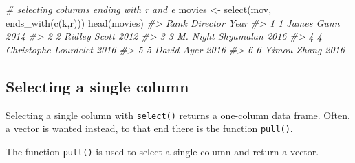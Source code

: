 \documentclass[
]{book}
\newenvironment{Shaded}{\begin{snugshade}}{\end{snugshade}}
\newcommand{\CommentTok}[1]{\textcolor[rgb]{0.56,0.35,0.01}{\textit{#1}}}
\newcommand{\FunctionTok}[1]{\textcolor[rgb]{0.00,0.00,0.00}{#1}}
\newcommand{\NormalTok}[1]{#1}
\newcommand{\OtherTok}[1]{\textcolor[rgb]{0.56,0.35,0.01}{#1}}
\newcommand{\StringTok}[1]{\textcolor[rgb]{0.31,0.60,0.02}{#1}}
\begin{document}
\begin{Shaded}
\begin{Highlighting}[]
\CommentTok{\# selecting columns ending with r and e}
\NormalTok{movies }\OtherTok{\textless{}{-}} \FunctionTok{select}\NormalTok{(mov, }\FunctionTok{ends\_with}\NormalTok{(}\FunctionTok{c}\NormalTok{(}\StringTok{\textquotesingle{}k\textquotesingle{}}\NormalTok{,}\StringTok{\textquotesingle{}r\textquotesingle{}}\NormalTok{)))}
\FunctionTok{head}\NormalTok{(movies)}
\CommentTok{\#\textgreater{}   Rank             Director Year}
\CommentTok{\#\textgreater{} 1    1           James Gunn 2014}
\CommentTok{\#\textgreater{} 2    2         Ridley Scott 2012}
\CommentTok{\#\textgreater{} 3    3   M. Night Shyamalan 2016}
\CommentTok{\#\textgreater{} 4    4 Christophe Lourdelet 2016}
\CommentTok{\#\textgreater{} 5    5           David Ayer 2016}
\CommentTok{\#\textgreater{} 6    6          Yimou Zhang 2016}
\end{Highlighting}
\end{Shaded}

\hypertarget{selecting-a-single-column}{%
\subsection{Selecting a single column}\label{selecting-a-single-column}}

Selecting a single column with \texttt{select()} returns a one-column data frame. Often, a vector is wanted instead, to that end there is the function \texttt{pull()}.

The function \texttt{pull()} is used to select a single column and return a vector.
\end{document}

